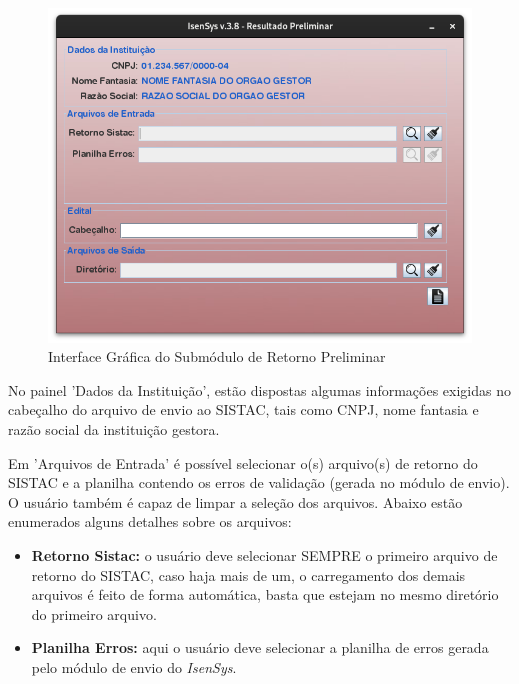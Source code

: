 \documentclass[
	12pt,			%
	openright,		%
	oneside,	
	a4paper,		%
	english,		%
	brazil			%
]{abntex2/abntex2}  %
\begin{document}
	\begin{figure}[H]
		\begin{center}
			
			\caption{Interface Gráfica do Submódulo de Retorno Preliminar}
			\label{retorno-prelim-ui}
			
			\includegraphics[scale=0.6]{img/retorno-prelim-ui}
			
		\end{center}
	\end{figure}
	
	No painel 'Dados da Instituição', estão dispostas algumas informações exigidas no cabeçalho do arquivo de envio ao SISTAC, tais como CNPJ, nome fantasia e razão social da instituição gestora.
	
	Em 'Arquivos de Entrada' é possível selecionar o(s) arquivo(s) de retorno do SISTAC e a planilha contendo os erros de validação (gerada no módulo de envio). O usuário também é capaz de limpar a seleção dos arquivos. Abaixo estão enumerados alguns detalhes sobre os arquivos:
	
	\begin{itemize}
		
		\item \textbf{Retorno Sistac:} o usuário deve selecionar SEMPRE o primeiro arquivo de retorno do SISTAC, caso haja mais de um, o carregamento dos demais arquivos é feito de forma automática, basta que estejam no mesmo diretório do primeiro arquivo.
		
		\item \textbf{Planilha Erros:} aqui o usuário deve selecionar a planilha de erros gerada pelo módulo de envio do \textit{IsenSys}.
		
	\end{itemize}
	
\end{document}

